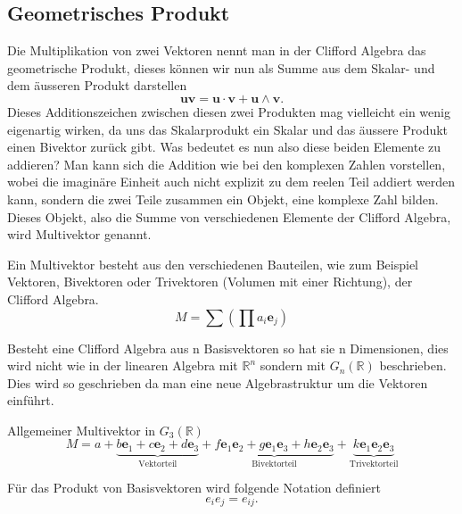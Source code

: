 \subsection{Geometrisches Produkt}
Die Multiplikation von zwei Vektoren nennt man in der Clifford Algebra das geometrische Produkt, dieses können wir nun als Summe aus dem Skalar- und dem äusseren Produkt darstellen
\begin{equation}
    \textbf{u}\textbf{v} = \textbf{u}\cdot \textbf{v} + \textbf{u} \wedge \textbf{v}.
\end{equation}
Dieses Additionszeichen zwischen diesen zwei Produkten mag vielleicht ein wenig eigenartig wirken, da uns das Skalarprodukt ein Skalar und das äussere Produkt einen Bivektor zurück gibt. Was bedeutet es nun also diese beiden Elemente zu addieren?
Man kann sich die Addition wie bei den komplexen Zahlen vorstellen, wobei die imaginäre Einheit auch nicht explizit zu dem reelen Teil addiert werden kann, sondern die zwei Teile zusammen ein Objekt, eine komplexe Zahl bilden. 
Dieses Objekt, also die Summe von verschiedenen Elemente der Clifford Algebra, wird Multivektor genannt.
\begin{definition}
Ein Multivektor besteht aus den verschiedenen Bauteilen, wie zum Beispiel Vektoren, Bivektoren oder Trivektoren (Volumen mit einer Richtung), der Clifford Algebra.
\begin{equation}
    M = \sum \left ( \prod a_i\textbf{e}_j \right)
\end{equation}
\end{definition}
Besteht eine Clifford Algebra aus n Basisvektoren so hat sie n Dimensionen, dies wird nicht wie in der linearen Algebra mit $\mathbb{R}^n$ sondern mit $G_n(\mathbb{R})$ beschrieben. Dies wird so geschrieben da man eine neue Algebrastruktur um die Vektoren einführt.
\begin{beispiel}
Allgemeiner Multivektor in $G_3(\mathbb{R})$
\begin{equation}
    M = a 
    + 
    \underbrace{b\textbf{e}_1 + c\textbf{e}_2 + d\textbf{e}_3}_{\text{Vektorteil}} 
    +
    \underbrace{f\textbf{e}_1\textbf{e}_2 + g\textbf{e}_1\textbf{e}_3 + h\textbf{e}_2\textbf{e}_3 }_{\text{Bivektorteil}} 
    +   
    \underbrace{k\textbf{e}_1\textbf{e}_2\textbf{e}_3}_{\text{Trivektorteil}}
\end{equation}
\end{beispiel}
\begin{definition}
Für das Produkt von Basisvektoren wird folgende Notation definiert
    \begin{equation}
        e_ie_j = e_{ij}.
    \end{equation}
\end{definition}
